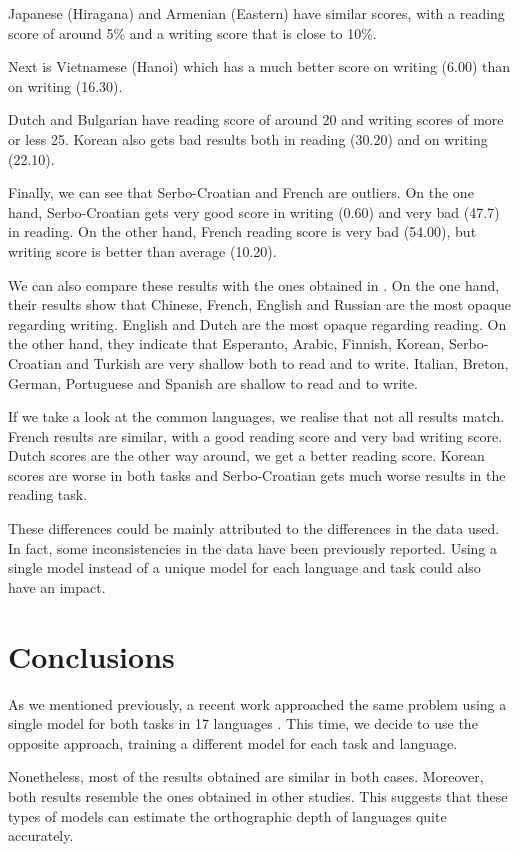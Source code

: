 \documentclass[11pt,a4paper]{article}
\begin{document}
Japanese (Hiragana) and Armenian (Eastern) have similar scores, with a reading score of around 5\% and a writing score that is close to 10\%.

Next is Vietnamese (Hanoi) which has a much better score on writing (6.00) than on writing (16.30).

Dutch and Bulgarian have reading score of around 20 and writing scores of more or less 25. Korean also gets bad results both in reading (30.20) and on writing (22.10).

Finally, we can see that Serbo-Croatian and French are outliers. On the one hand, Serbo-Croatian gets very good score in writing (0.60) and very bad (47.7) in reading. On the other hand, French reading score is very bad (54.00), but writing score is better than average (10.20).

We can also compare these results with the ones obtained in \citet{marjou2021oteann}. On the one hand, their results show that Chinese, French, English and Russian are the most opaque regarding writing. English and Dutch are the most opaque regarding reading. On the other hand, they indicate that Esperanto, Arabic, Finnish, Korean, Serbo-Croatian and Turkish are very shallow both to read and to write. Italian, Breton, German, Portuguese and Spanish are shallow to read and to write.

If we take a look at the common languages, we realise that not all results match. French results are similar, with a good reading score and very bad writing score. Dutch scores are the other way around, we get a better reading score. Korean scores are worse in both tasks and Serbo-Croatian gets much worse results in the reading task.

These differences could be mainly attributed to the differences in the data used. In fact, some inconsistencies in the data have been previously reported. Using a single model instead of a unique model for each language and task could also have an impact.

\section{Conclusions}

As we mentioned previously, a recent work approached the same problem using a single model for both tasks in 17 languages \cite{marjou2021oteann}. This time, we decide to use the opposite approach, training a different model for each task and language. 

Nonetheless, most of the results obtained are similar in both cases. Moreover, both results resemble the ones obtained in other studies. This suggests that these types of models can estimate the orthographic depth of languages quite accurately.
\end{document}
